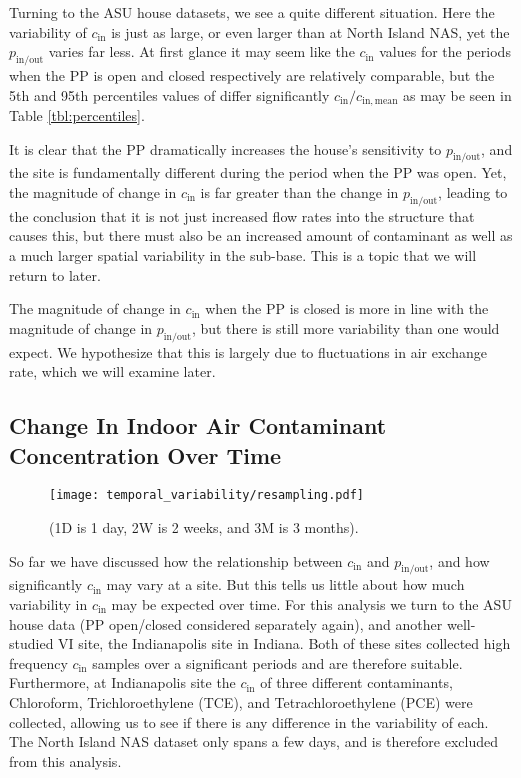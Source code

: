 \documentclass[journal=esthag,manuscript=article]{achemso}
\begin{document}
Turning to the ASU house datasets, we see a quite different situation.
Here the variability of $c_\mathrm{in}$ is just as large, or even larger than at North Island NAS, yet the $p_\mathrm{in/out}$ varies far less.
At first glance it may seem like the $c_\mathrm{in}$ values for the periods when the PP is open and closed respectively are relatively comparable, but the 5th and 95th percentiles values of differ significantly $c_\mathrm{in}/c_\mathrm{in,mean}$ as may be seen in Table \ref{tbl:percentiles}.

It is clear that the PP dramatically increases the house's sensitivity to $p_\mathrm{in/out}$, and the site is fundamentally different during the period when the PP was open.
Yet, the magnitude of change in $c_\mathrm{in}$ is far greater than the change in $p_\mathrm{in/out}$, leading to the conclusion that it is not just increased flow rates into the structure that causes this, but there must also be an increased amount of contaminant as well as a much larger spatial variability in the sub-base.
This is a topic that we will return to later.

The magnitude of change in $c_\mathrm{in}$ when the PP is closed is more in line with the magnitude of change in $p_\mathrm{in/out}$, but there is still more variability than one would expect.
We hypothesize that this is largely due to fluctuations in air exchange rate, which we will examine later.

\subsection{Change In Indoor Air Contaminant Concentration Over Time} %

\begin{figure}[htb!] %
  \centering
  \caption{ (1D is 1 day, 2W is 2 weeks, and 3M is 3 months).}
  \label{fig:resampling}
  \texttt{[image: temporal\_variability/resampling.pdf]}
\end{figure}

So far we have discussed how the relationship between $c_\mathrm{in}$ and $p_\mathrm{in/out}$, and how significantly $c_\mathrm{in}$ may vary at a site.
But this tells us little about how much variability in $c_\mathrm{in}$ may be expected over time.
For this analysis we turn to the ASU house data (PP open/closed considered separately again), and another well-studied VI site, the Indianapolis site in Indiana.
Both of these sites collected high frequency $c_\mathrm{in}$ samples over a significant periods and are therefore suitable. %
Furthermore, at Indianapolis site the $c_\mathrm{in}$ of three different contaminants, Chloroform, Trichloroethylene (TCE), and Tetrachloroethylene (PCE) were collected, allowing us to see if there is any difference in the variability of each.
The North Island NAS dataset only spans a few days, and is therefore excluded from this analysis.
\end{document}
